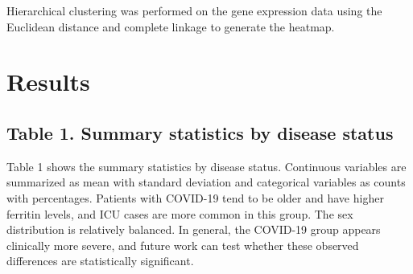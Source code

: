 \documentclass{article}
\begin{document}
Hierarchical clustering was performed on the gene expression data using the Euclidean distance and complete linkage to generate the heatmap.

\section{Results}

\subsection{Table 1. Summary statistics by disease status}

Table 1 shows the summary statistics by disease status. Continuous variables are summarized as mean with standard deviation and categorical variables as counts with percentages. Patients with COVID-19 tend to be older and have higher ferritin levels, and ICU cases are more common in this group. The sex distribution is relatively balanced. In general, the COVID-19 group appears clinically more severe, and future work can test whether these observed differences are statistically significant.
\end{document}
